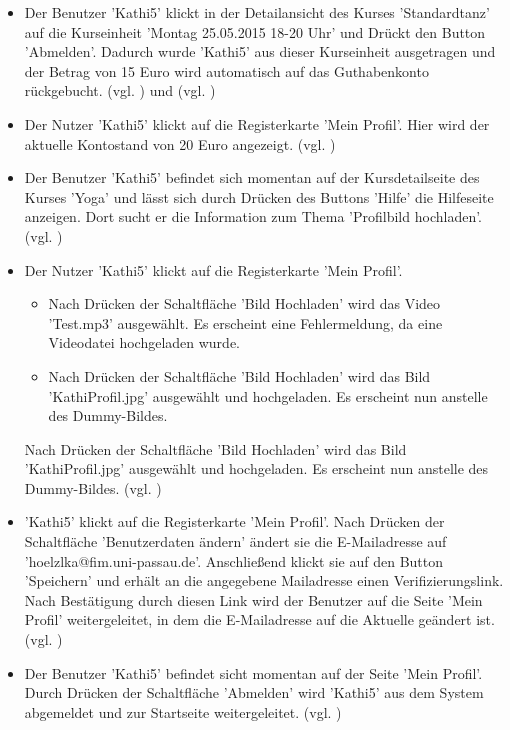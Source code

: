 \documentclass[a4paper]{scrreprt}
\begin{document}
\begin{itemize}
				\item {}
				Der Benutzer 'Kathi5' klickt in der Detailansicht des Kurses 'Standardtanz' auf die Kurseinheit 'Montag 25.05.2015 18-20 Uhr' und Drückt den Button 'Abmelden'. Dadurch wurde 'Kathi5' aus dieser Kurseinheit ausgetragen und der Betrag von 15 Euro wird automatisch auf das Guthabenkonto rückgebucht. (vgl. ) und (vgl. )
				
				\item {}
				Der Nutzer 'Kathi5' klickt auf die Registerkarte 'Mein Profil'. Hier wird der aktuelle Kontostand von 20 Euro angezeigt. (vgl. )
				
				\item {}
				Der Benutzer 'Kathi5' befindet sich momentan auf der Kursdetailseite des Kurses 'Yoga' und lässt sich durch Drücken des Buttons 'Hilfe' die Hilfeseite anzeigen. Dort sucht er die Information zum Thema 'Profilbild hochladen'. (vgl. )
					
				\item {}
				Der Nutzer 'Kathi5' klickt auf die Registerkarte 'Mein Profil'. 
					\begin{itemize}
						\item Nach Drücken der Schaltfläche 'Bild Hochladen' wird das Video 'Test.mp3' ausgewählt. Es erscheint eine Fehlermeldung, da eine Videodatei hochgeladen wurde.
						\item Nach Drücken der Schaltfläche 'Bild Hochladen' wird das Bild 'KathiProfil.jpg' ausgewählt und hochgeladen. Es erscheint nun anstelle des Dummy-Bildes.		
					\end{itemize}
				
				Nach Drücken der Schaltfläche 'Bild Hochladen' wird das Bild 'KathiProfil.jpg' ausgewählt und hochgeladen. Es erscheint nun anstelle des Dummy-Bildes. (vgl. )
				
				\item {}
				'Kathi5' klickt auf die Registerkarte 'Mein Profil'. Nach Drücken der Schaltfläche 'Benutzerdaten ändern' ändert sie die E-Mailadresse auf 'hoelzlka@fim.uni-passau.de'. Anschließend klickt sie auf den Button 'Speichern' und erhält an die angegebene Mailadresse einen Verifizierungslink. Nach Bestätigung durch diesen Link wird der Benutzer auf die Seite 'Mein Profil' weitergeleitet, in dem die E-Mailadresse auf die Aktuelle geändert ist. (vgl. )
				
				\item {}
				Der Benutzer 'Kathi5' befindet sicht momentan auf der Seite 'Mein Profil'. Durch Drücken der Schaltfläche 'Abmelden' wird 'Kathi5' aus dem System abgemeldet und zur Startseite weitergeleitet. (vgl. )
					
			\end{itemize}
\end{document}
